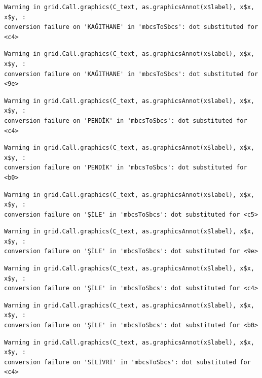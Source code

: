 \documentclass[
  11pt,
  a4paper,
  DIV=11,
  numbers=noendperiod]{scrartcl}
\begin{document}
\begin{verbatim}
Warning in grid.Call.graphics(C_text, as.graphicsAnnot(x$label), x$x, x$y, :
conversion failure on 'KAĞITHANE' in 'mbcsToSbcs': dot substituted for <c4>
\end{verbatim}

\begin{verbatim}
Warning in grid.Call.graphics(C_text, as.graphicsAnnot(x$label), x$x, x$y, :
conversion failure on 'KAĞITHANE' in 'mbcsToSbcs': dot substituted for <9e>
\end{verbatim}

\begin{verbatim}
Warning in grid.Call.graphics(C_text, as.graphicsAnnot(x$label), x$x, x$y, :
conversion failure on 'PENDİK' in 'mbcsToSbcs': dot substituted for <c4>
\end{verbatim}

\begin{verbatim}
Warning in grid.Call.graphics(C_text, as.graphicsAnnot(x$label), x$x, x$y, :
conversion failure on 'PENDİK' in 'mbcsToSbcs': dot substituted for <b0>
\end{verbatim}

\begin{verbatim}
Warning in grid.Call.graphics(C_text, as.graphicsAnnot(x$label), x$x, x$y, :
conversion failure on 'ŞİLE' in 'mbcsToSbcs': dot substituted for <c5>
\end{verbatim}

\begin{verbatim}
Warning in grid.Call.graphics(C_text, as.graphicsAnnot(x$label), x$x, x$y, :
conversion failure on 'ŞİLE' in 'mbcsToSbcs': dot substituted for <9e>
\end{verbatim}

\begin{verbatim}
Warning in grid.Call.graphics(C_text, as.graphicsAnnot(x$label), x$x, x$y, :
conversion failure on 'ŞİLE' in 'mbcsToSbcs': dot substituted for <c4>
\end{verbatim}

\begin{verbatim}
Warning in grid.Call.graphics(C_text, as.graphicsAnnot(x$label), x$x, x$y, :
conversion failure on 'ŞİLE' in 'mbcsToSbcs': dot substituted for <b0>
\end{verbatim}

\begin{verbatim}
Warning in grid.Call.graphics(C_text, as.graphicsAnnot(x$label), x$x, x$y, :
conversion failure on 'SİLİVRİ' in 'mbcsToSbcs': dot substituted for <c4>
\end{verbatim}
\end{document}
